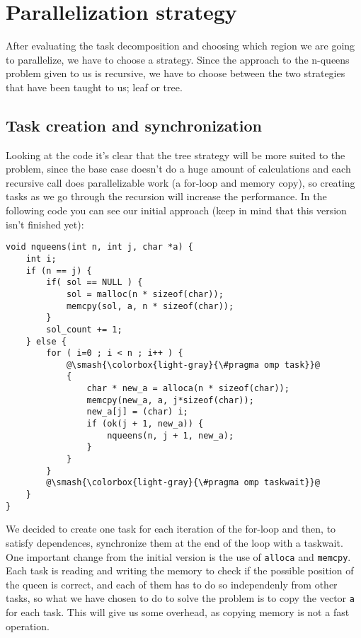 
\section{Parallelization strategy}
\justify
After evaluating the task decomposition and choosing which region we are going to parallelize, we have to choose a strategy. Since the approach to the n-queens problem given to us is recursive, we have to choose between the two strategies that have been taught to us; leaf or tree.
\justify
\subsection{Task creation and synchronization}
Looking at the code it's clear that the tree strategy will be more suited to the problem, since the base case doesn't do a huge amount of calculations and each recursive call does parallelizable work (a for-loop and memory copy), so creating tasks as we go through the recursion will increase the performance.
\justify
In the following code you can see our initial approach (keep in mind that this version isn't finished yet):

\begin{lstlisting}[escapechar=@]
void nqueens(int n, int j, char *a) {
    int i;
    if (n == j) {
        if( sol == NULL ) {
            sol = malloc(n * sizeof(char));
            memcpy(sol, a, n * sizeof(char));
        }
        sol_count += 1;
    } else {
        for ( i=0 ; i < n ; i++ ) {
            @\smash{\colorbox{light-gray}{\#pragma omp task}}@
            {
                char * new_a = alloca(n * sizeof(char));
                memcpy(new_a, a, j*sizeof(char));
                new_a[j] = (char) i;
                if (ok(j + 1, new_a)) {
                    nqueens(n, j + 1, new_a);
                }
            }
        }
        @\smash{\colorbox{light-gray}{\#pragma omp taskwait}}@
    }
}
\end{lstlisting}
\justify
We decided to create one task for each iteration of the for-loop and then, to satisfy dependences, synchronize them at the end of the loop with a taskwait. One important change from the initial version is the use of \texttt{alloca} and \texttt{memcpy}. Each task is reading and writing the memory to check if the possible position of the queen is correct, and each of them has to do so independenly from other tasks, so what we have chosen to do to solve the problem is to copy the vector \texttt{a} for each task. This will give us some overhead, as copying memory is not a fast operation.
\justify

